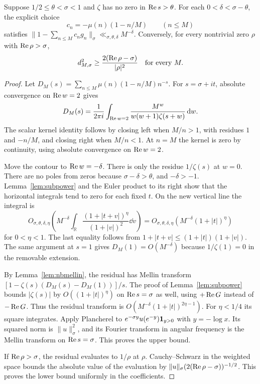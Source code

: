 \begin{theorem}\label{thm:shifted}
Suppose \(1/2\le\theta<\sigma<1\) and \(\zeta\) has no zero in \(\operatorname{Re} s>\theta\). For each \(0<\delta<\sigma-\theta\), the explicit choice
\[
 c_n=-\mu(n)(1-n/M)\qquad (n\le M)
\]
satisfies \(\|1-\sum_{n\le M}c_ng_n\|_\sigma\ll_{\sigma,\theta,\delta}M^{-\delta}\). Conversely, for every nontrivial zero \(\rho\) with \(\operatorname{Re}\rho>\sigma\),
\[
 d_{M,\sigma}^2\ge \frac{2(\operatorname{Re}\rho-\sigma)}{|\rho|^2}
 \quad\text{for every }M .
\]
\end{theorem}
\begin{proof}
Let \(D_M(s)=\sum_{n\le M}\mu(n)(1-n/M)n^{-s}\). For \(s=\sigma+it\), absolute convergence on \(\operatorname{Re} w=2\) gives
\[
 D_M(s)=\frac1{2\pi i}\int_{\operatorname{Re} w=2}
        \frac{M^w}{w(w+1)\zeta(s+w)}\,\mathrm d w .
\]
The scalar kernel identity follows by closing left when \(M/n>1\), with residues \(1\) and \(-n/M\), and closing right when \(M/n<1\). At \(n=M\) the kernel is zero by continuity, using absolute convergence on \(\operatorname{Re} w=2\).

Move the contour to \(\operatorname{Re} w=-\delta\). There is only the residue \(1/\zeta(s)\) at \(w=0\). There are no poles from zeros because \(\sigma-\delta>\theta\), and \(-\delta>-1\). Lemma~\ref{lem:subpower} and the Euler product to its right show that the horizontal integrals tend to zero for each fixed \(t\). On the new vertical line the integral is
\[
 O_{\sigma,\theta,\delta,\eta}
 \left(M^{-\delta}\int_{\mathbb R}
 \frac{(1+|t+v|)^\eta}{(1+|v|)^2}\dd v\right)
 =O_{\sigma,\theta,\delta,\eta}(M^{-\delta}(1+|t|)^\eta)
\]
for \(0<\eta<1\). The last equality follows from \(1+|t+v|\le(1+|t|)(1+|v|)\). The same argument at \(s=1\) gives \(D_M(1)=O(M^{-\delta})\) because \(1/\zeta(1)=0\) in the removable extension.

By Lemma~\ref{lem:nbmellin}, the residual has Mellin transform \([1-\zeta(s)(D_M(s)-D_M(1))]/s\). The proof of Lemma~\ref{lem:subpower} bounds \(|\zeta(s)|\) by \(O((1+|t|)^\eta)\) on \(\operatorname{Re} s=\sigma\) as well, using \(+\operatorname{Re} G\) instead of \(-\operatorname{Re} G\). Thus the residual transform is \(O(M^{-\delta}(1+|t|)^{2\eta-1})\). For \(\eta<1/4\) its square integrates. Apply Plancherel to \(e^{-\sigma y}u(e^{-y})\mathbf 1_{y>0}\) with \(y=-\log x\). Its squared norm is \(\|u\|_\sigma^2\), and its Fourier transform in angular frequency is the Mellin transform on \(\operatorname{Re} s=\sigma\). This proves the upper bound.

If \(\operatorname{Re}\rho>\sigma\), the residual evaluates to \(1/\rho\) at \(\rho\). Cauchy--Schwarz in the weighted space bounds the absolute value of the evaluation by \(\|u\|_\sigma(2(\operatorname{Re}\rho-\sigma))^{-1/2}\). This proves the lower bound uniformly in the coefficients.
\end{proof}

